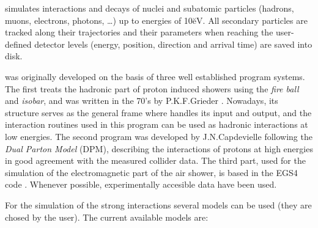 \CORSIKA simulates interactions and decays of nuclei and subatomic
particles (hadrons, muons, electrons, photons, \ldots) up to energies
of 10\u{eV}. All secondary particles are tracked along their
trajectories and their parameters when reaching the user-defined
detector levels (energy, position, direction and arrival time) are
saved into disk.

\CORSIKA was originally developed on the basis of three well
established program systems. The first treats the hadronic part of
proton induced showers using the \emph{fire ball} and \emph{isobar},
and was written in the 70's by P.K.F.Grieder \cite{Grieder:1979}.
Nowadays, its structure serves as the general frame where \CORSIKA
handles its input and output, and the interaction routines used in
this program can be used as hadronic interactions at low energies. The
second program was developed by J.N.Capdevielle
\cite{Capdevielle:1989} following the \emph{Dual Parton Model}
(DPM)\cite{Capella:1980}, describing the interactions of protons at
high energies in good agreement with the measured collider data. The
third part, used for the simulation of the electromagnetic part of the
air shower, is based in the EGS4 code \cite{EGS4}. Whenever possible,
experimentally accesible data have been used.

For the simulation of the strong interactions several models can be
used (they are chosed by the user). The current available models are:

